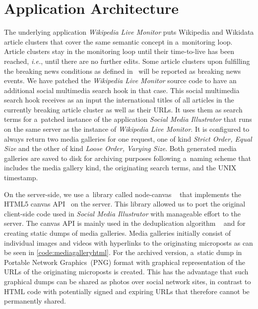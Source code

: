 \documentclass{sig-alternate}
\begin{document}
\section{Application Architecture}
\label{sec:application-architecture}
\selectfont

The underlying application \emph{Wikipedia Live Monitor}
puts Wiki\-pedia and Wikidata article clusters
that cover the same semantic concept
in a~monitoring loop.
Article clusters stay in the monitoring loop until
their time-to-live has been reached,
\emph{i.e.}, until there are no further edits.
Some article clusters upon fulfilling the breaking news conditions
as defined in~\cite{steiner2013mjnomore}
will be reported as breaking news events.
We have patched the \emph{Wikipedia Live Monitor} source code
to have an additional social multimedia search hook in that case.
This social multimedia search hook receives as an input
the international titles of all articles
in the currently breaking article cluster as well as their URLs.
It uses them as search terms for a~patched instance
of the application \emph{Social Media Illustrator}
that runs on the same server
as the instance of \emph{Wikipedia Live Monitor}.
It is configured to always return two media galleries
for one request, one of kind \emph{Strict Order, Equal Size}
and the other of kind \emph{Loose Order, Varying Size}.
Both generated media galleries are saved to disk
for archiving purposes following a~naming scheme
that includes the media gallery kind,
the originating search terms, and the UNIX timestamp.

On the server-side, we use a~library called node-canvas%
~\cite{holowaychuk2013nodecanvas} that implements the
HTML5 canvas API~\cite{cabanier2013canvas} on the server.
This library allowed us to port the original client-side code 
used in \emph{Social Media Illustrator}
with manageable effort to the server.
The canvas API is mainly used in the deduplication algorithm%
~\cite{steiner2013clustering}
and for creating static dumps of media galleries.
Media galleries initially consist of individual images and videos
with hyperlinks to the originating microposts
as can be seen in \autoref{code:mediagalleryhtml}.
For the archived version, a~static dump
in Portable Network Graphics~(PNG) format
with graphical representation of the URLs
of the originating microposts is created.
This has the advantage that such graphical dumps
can be shared as photos over social network sites,
in contrast to  HTML code with potentially signed and expiring URLs
that therefore cannot be permanently shared.
\end{document}
